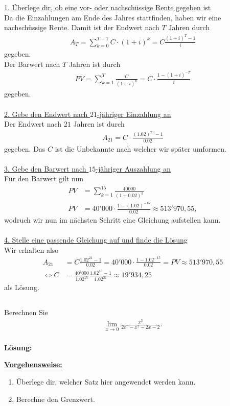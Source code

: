 \underline{1. Überlege dir, ob eine vor- oder nachschüssige Rente gegeben ist}\\
Da die Einzahlungen am Ende des Jahres stattfinden, haben wir eine nachschüssige Rente.
Damit ist der Endwert nach $T$ Jahren durch
\begin{align*}
A_T = \sum \limits_{k=0}^{T-1} C \cdot( 1+ i)^k = C \frac{(1+i)^{ T}- 1}{i}
\end{align*} 
gegeben.\\
Der Barwert nach $T$ Jahren ist durch
\begin{align*}
PV = \sum \limits_{k=1}^T \frac{C}{(1+i)^k}
= C \cdot \frac{1-(1+i)^{-T}}{i}
\end{align*}
gegeben.
\\
\\
\underline{2. Gebe den Endwert nach $21$-jähriger Einzahlung an}\\
Der Endwert nach $21$ Jahren ist durch
\begin{align*}
A_{21} = C \cdot \frac{(1.02)^{21}-1}{0.02}
\end{align*}
gegeben.
Das $C$ ist die Unbekannte nach welcher wir später umformen.
\\
\\
\underline{3. Gebe den Barwert nach $15$-jähriger Auszahlung an}\\
Für den Barwert gilt nun 
\begin{align*}
PV
&=
\sum \limits_{k=1}^{15} \frac{40000}{(1 +0.02)^k}\\ 
PV &= 40'000 \cdot \frac{1-(1.02)^{-15}}{0.02}
\approx 513'970,55,
\end{align*}
wodruch wir nun im nächsten Schritt eine Gleichung aufstellen kann.\\
\\
\underline{4. Stelle eine passende Gleichung auf und finde die Lösung}\\
Wir erhalten also
\begin{align*}
A_{21} &=
C \frac{1.02^{21}-1}{0.02} = 40'000 \cdot \frac{1 - 1.02^{-15}}{0.02}
= PV \approx 513'970,55\\
\Leftrightarrow
C &= \frac{40'000}{1.02^{15}}\frac{1.02^{15}-1}{1.02^{21}}
\approx 19'934,25
\end{align*}
als Lösung.

\newpage
\subsection*{}
Berechnen Sie
\begin{align*}
\lim \limits_{x \rightarrow 0}
\frac{x^3}{2e^x-x^2-2x-2}.
\end{align*}
\\
\textbf{Lösung:}
\begin{mdframed}
\underline{\textbf{Vorgehensweise:}}
\begin{enumerate}
\item Überlege dir, welcher Satz hier angewendet werden kann.
\item Berechne den Grenzwert.
\end{enumerate}
\end{mdframed}

